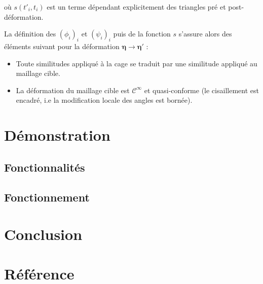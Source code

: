 \documentclass[10pt,a4paper]{article}
\begin{document}
où $s \left(t'_i, t_i \right)$ est un terme dépendant explicitement des triangles pré et post-déformation.

La définition des $\left( \phi_i \right)_i$ et $\left( \psi_i \right)_i$ puis de la fonction $s$ s'assure alors des éléments suivant pour la déformation $\boldsymbol\eta \rightarrow \boldsymbol\eta'$ :
\begin{itemize}
\item Toute similitudes appliqué à la cage se traduit par une similitude appliqué au maillage cible.
\item La déformation du maillage cible est $\mathcal{C}^\infty$ et quasi-conforme (le cisaillement est encadré, i.e la modification locale des angles est bornée).
\end{itemize}

\section{Démonstration}

\subsection{Fonctionnalités}

\subsection{Fonctionnement}

\section*{Conclusion}

\section*{Référence}




\end{document}
